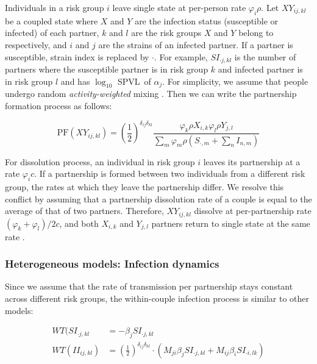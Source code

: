 \documentclass[10pt,letterpaper]{article}
\newcommand{\kkhalf}{\left(\frac{1}{2}\right)^{\delta_{ij} \delta_{kl}}}  %
\newcommand{\Lspvl}{$\log_{10}$ SPVL}
\newcommand{\PF}{\textrm{PF}}
\begin{document}
Individuals in a risk group $i$ leave single state at per-person rate $\varphi_i \rho$. Let $XY_{ij,kl}$ be a coupled state where $X$ and $Y$ are the infection status (susceptible or infected) of each partner, $k$ and $l$ are the risk groups $X$ and $Y$ belong to respectively, and $i$ and $j$ are the strains of an infected partner. If a partner is susceptible, strain index is replaced by $\cdot$. For example, $SI_{\cdot j,kl}$ is the number of partners where the susceptible partner is in risk group $k$ and infected partner is in risk group $l$ and has \Lspvl\ of $\alpha_j$. For simplicity, we assume that people undergo random \emph{activity-weighted} mixing \cite{may_transmission_1988}. Then we can write the partnership formation process as follows:

\begin{equation}
\PF(XY_{ij, kl}) = \kkhalf \frac{\varphi_k \rho X_{i,k} \varphi_l \rho Y_{j, l}}{\sum\limits_m \varphi_m \rho (S_{\cdot, m} + \sum\limits_n I_{n,m})}
\end{equation}

For dissolution process, an individual in risk group $i$ leaves its partnership at a rate $\varphi_i c$. If a partnership is formed between two individuals from a different risk group, the rates at which they leave the partnership differ. We resolve this conflict by assuming that a partnership dissolution rate of a couple is equal to the average of that of two partners. Therefore, $XY_{ij, kl}$ dissolve at per-partnership rate $(\varphi_k + \varphi_l)/2 c$, and both $X_{i,k}$ and $Y_{j,l}$ partners return to single state at the same rate \cite{herbeck_evolution_2016}.

\subsubsection*{Heterogeneous models: Infection dynamics}

Since we assume that the rate of transmission per partnership stays constant across different risk groups, the within-couple infection process is similar to other models:

\begin{equation}
\begin{aligned}
WT(SI_{\cdot j, kl} &= - \beta_j SI_{\cdot j, kl}\\
WT(II_{ij, kl}) &= \kkhalf \cdot (M_{ji} \beta_j SI_{\cdot j, kl} + M_{ij} \beta_i SI_{\cdot i, lk})
\end{aligned}
\end{equation}
\end{document}
